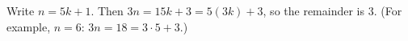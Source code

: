 Write $n=5k+1$. Then $3n=15k+3=5(3k)+3$, so the remainder is $\boxed{3}$. (For example, $n=6$: $3n=18=3\cdot5+3$.)
